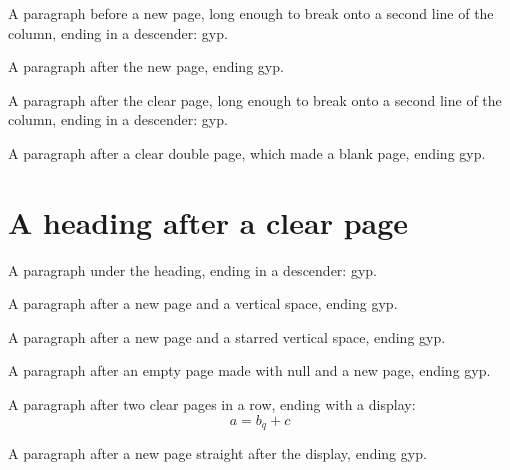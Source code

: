\documentclass[twoside]{article}
\begin{document}
A paragraph before a new page, long enough to break onto a second line of the
column, ending in a descender: gyp.

A paragraph after the new page, ending gyp.

A paragraph after the clear page, long enough to break onto a second line of
the column, ending in a descender: gyp.

A paragraph after a clear double page, which made a blank page, ending gyp.

\section{A heading after a clear page}
A paragraph under the heading, ending in a descender: gyp.

\vspace{20pt}
A paragraph after a new page and a vertical space, ending gyp.

\vspace*{20pt}
A paragraph after a new page and a starred vertical space, ending gyp.

A paragraph after an empty page made with null and a new page, ending gyp.

A paragraph after two clear pages in a row, ending with a display:
\[ a = b_q + c \]

A paragraph after a new page straight after the display, ending gyp.
\end{document}
